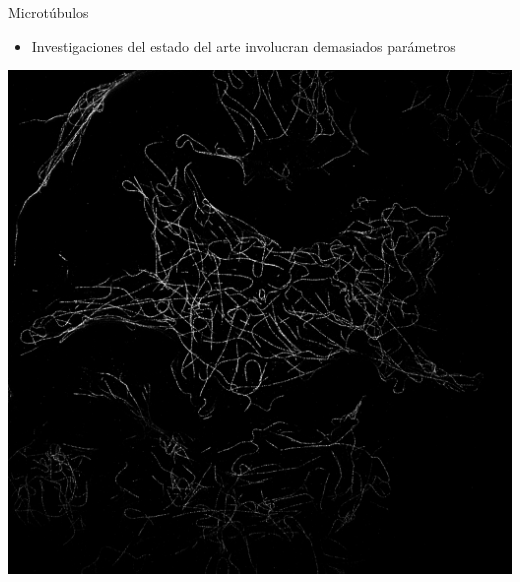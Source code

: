 \documentclass[10pt]{beamer}
\begin{document}
\begin{frame}[fragile]{Microt\'ubulos}
\begin{itemize}
    \item Investigaciones del estado del arte involucran demasiados par\'ametros
\end{itemize}

\begin{center}
    \includegraphics[width=\textwidth]{microtubulos_MAX.png}
        \end{center}
\end{frame}
\end{document}
